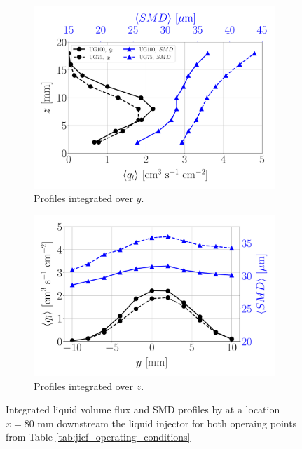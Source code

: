 \begin{figure}[h!]
\flushleft
\begin{subfigure}[b]{0.45\textwidth}
	\flushleft
   \includegraphics[scale=0.275]{./part2_developments/figures_ch6_lagrangian_JICF/expe_results/integrated_fluxes_along_y}
   \vspace*{-0.2in}
   \caption{Profiles integrated over $y$.}
  \label{fig:integrated_results_Becker_expe_results_over_y} 
\end{subfigure}
\hspace{0.3in}
\begin{subfigure}[b]{0.45\textwidth}
	\centering
   \includegraphics[scale=0.275]{./part2_developments/figures_ch6_lagrangian_JICF/expe_results/integrated_fluxes_along_z}
   \vspace*{-0.2in}
   \caption{Profiles integrated over $z$.}
  \label{fig:integrated_results_Becker_expe_results_over_z}
\end{subfigure}
\caption[{Integrated liquid volume flux and SMD profiles by  at a location $x = 80$ mm downstream the liquid injector.}]{Integrated liquid volume flux and SMD profiles by  at a location $x = 80$ mm downstream the liquid injector for both operaing points from Table \ref{tab:jicf_operating_conditions}}
\label{fig:integrated_results_Becker_expe_results}
\end{figure}

